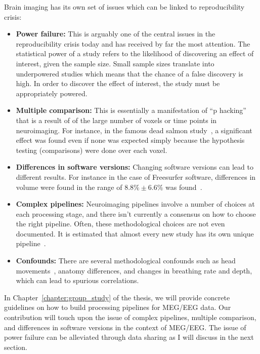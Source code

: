 Brain imaging has its own set of issues which can be linked to reproducibility crisis: 


\begin{itemize}[noitemsep,partopsep=0pt]
\item \textbf{Power failure:} This is arguably one of the central issues in the reproducibility crisis today and has received by far the most attention. The statistical power of a study refers to the likelihood of discovering an effect of interest, given the sample size. Small sample sizes translate into underpowered studies which means that the chance of a false discovery is high. In order to discover the effect of interest, the study must be appropriately powered.
\item \textbf{Multiple comparison:} This is essentially a manifestation of ``p hacking'' that is a result of of the large number of voxels or time points in neuroimaging. For instance, in the famous dead salmon study~\citep{bennett2009neural}, a significant effect was found even if none was expected simply because the hypothesis testing (comparisons) were done over each voxel.
\item \textbf{Differences in software versions:} Changing software versions can lead to different results. For instance in the case of Freesurfer software, differences in volume were found in the range of $8.8\% \pm 6.6\%$ was found~\citep{gronenschild2012effects}.
\item \textbf{Complex pipelines:} Neuroimaging pipelines involve a number of choices at each processing stage, and there isn't currently a consensus on how to choose the right pipeline. Often, these methodological choices are not even documented. It is estimated that almost every new study has its own unique pipeline~\citep{Carp2012289}.
\item \textbf{Confounds:} There are several methodological confounds such as head movements~\citep{yendiki2014spurious}, anatomy differences, and changes in breathing rate and depth, which can lead to spurious correlations.
\end{itemize}

In Chapter~\ref{chapter:group_study} of the thesis, we will provide concrete guidelines on how to build processing pipelines for \ac{MEG}/\ac{EEG} data. Our contribution will touch upon the issue of complex pipelines, multiple comparison, and differences in software versions in the context of \ac{MEG}/\ac{EEG}. The issue of power failure can be alleviated through data sharing as I will discuss in the next section.

